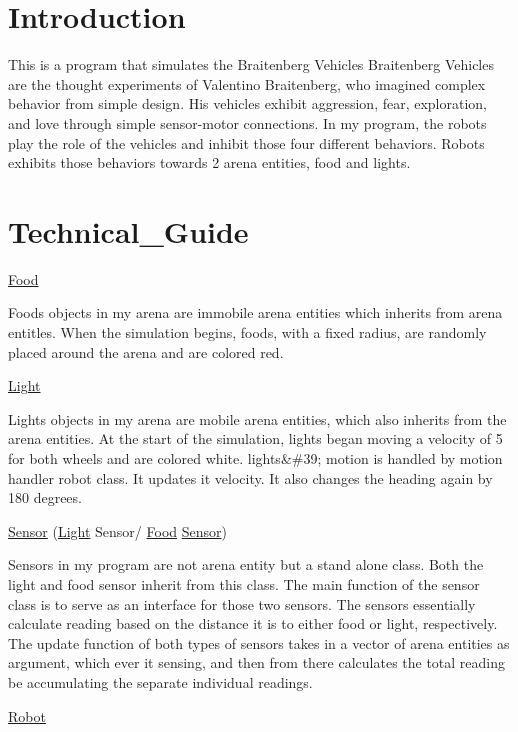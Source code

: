 \hypertarget{index_intro_sec}{}\section{Introduction}\label{index_intro_sec}
This is a program that simulates the Braitenberg Vehicles Braitenberg Vehicles are the thought experiments of Valentino Braitenberg, who imagined complex behavior from simple design. His vehicles exhibit aggression, fear, exploration, and love through simple sensor-\/motor connections. In my program, the robots play the role of the vehicles and inhibit those four different behaviors. Robots exhibits those behaviors towards 2 arena entities, food and lights.\hypertarget{index_Technical_Guide}{}\section{Technical\+\_\+\+Guide}\label{index_Technical_Guide}
\mbox{\hyperlink{class_food}{Food}}

Foods objects in my arena are immobile arena entities which inherits from arena entitles. When the simulation begins, foods, with a fixed radius, are randomly placed around the arena and are colored red.

\mbox{\hyperlink{class_light}{Light}}

Lights objects in my arena are mobile arena entities, which also inherits from the arena entities. At the start of the simulation, lights began moving a velocity of 5 for both wheels and are colored white. lights\&\#39; motion is handled by motion handler robot class. It updates it velocity. It also changes the heading again by 180 degrees.

\mbox{\hyperlink{class_sensor}{Sensor}} (\mbox{\hyperlink{class_light}{Light}} Sensor/ \mbox{\hyperlink{class_food}{Food}} \mbox{\hyperlink{class_sensor}{Sensor}})

Sensors in my program are not arena entity but a stand alone class. Both the light and food sensor inherit from this class. The main function of the sensor class is to serve as an interface for those two sensors. The sensors essentially calculate reading based on the distance it is to either food or light, respectively. The update function of both types of sensors takes in a vector of arena entities as argument, which ever it sensing, and then from there calculates the total reading be accumulating the separate individual readings.

\mbox{\hyperlink{class_robot}{Robot}}

